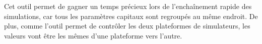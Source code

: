  Cet outil permet de gagner un temps précieux lors de l'enchaînement rapide des simulations, car tous les paramètres capitaux sont regroupés au même endroit. De plus, comme l'outil permet de contrôler les deux plateformes de simulateurs, les valeurs vont être les mêmes d'une plateforme vers l'autre.
